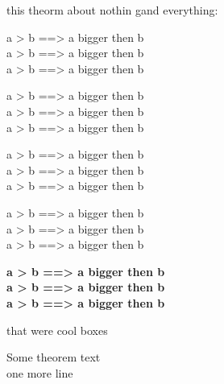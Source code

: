 \documentclass[12pt]{article}
\begin{document}
\begin{Theorem}{}

    this theorm about nothin gand everything:\\

    \medskip
    \begin{tcbraster}[raster columns=2,raster halign=right]
        \begin{tbox}[colorTheorem][0cm][2pt][10]
            \centering
            a > b ==> a bigger then b\\
            a > b ==> a bigger then b\\
            a > b ==> a bigger then b
        \end{tbox}
        \begin{tbox}[colorTheorem][0cm][2pt][10]
            \centering
            a > b ==> a bigger then b\\
            a > b ==> a bigger then b\\
            a > b ==> a bigger then b
        \end{tbox}
        \begin{tbox}[colorTheorem][0cm][2pt][10]
            \centering
            a > b ==> a bigger then b\\
            a > b ==> a bigger then b\\
            a > b ==> a bigger then b
        \end{tbox}
    \end{tcbraster}

    \begin{tbox}[colorTheorem][0cm][2pt][10]
        \centering
        a > b ==> a bigger then b\\
        a > b ==> a bigger then b\\
        a > b ==> a bigger then b
    \end{tbox}

    \begin{tbox}[colorTheorem][0cm][2pt][10]
        \centering
        \textbf{%
            a > b ==> a bigger then b\\
            a > b ==> a bigger then b\\
            a > b ==> a bigger then b
        }
    \end{tbox}
    \medskip


    that were cool boxes


    \begin{TheoremProof}{}
        Some theorem text\\
        one more line
    \end{TheoremProof}
    
\end{Theorem}
\end{document}
